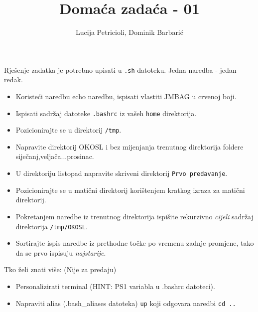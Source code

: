 \documentclass[12pt,a4paper]{article}
\newcommand{\shell}[1]{\texttt{#1}}
\begin{document}
  \title{Domaća zadaća - 01}
  \author{Lucija Petricioli, Dominik Barbarić}
  \maketitle
  Rješenje zadatka je potrebno upisati u \shell{.sh} datoteku. Jedna naredba - jedan redak.
  \begin{itemize}
    \item Koristeći naredbu echo naredbu, ispisati vlastiti JMBAG u crvenoj boji.
    \item Ispisati sadržaj datoteke \shell{.bashrc} iz vašeh \shell{home} direktorija.
    \item Pozicionirajte se u direktorij \shell{/tmp}.
    \item Napravite direktorij OKOSL i bez mijenjanja trenutnog direktorija foldere siječanj,veljača...prosinac.
    \item U direktoriju listopad napravite skriveni direktorij \shell{Prvo predavanje}.
    \item Pozicionirajte se u matični direktorij korištenjem kratkog izraza za matični direktorij.
    \item Pokretanjem naredbe iz trenutnog direktorija ispišite rekurzivno \textit{cijeli} sadržaj direktorija \shell{/tmp/OKOSL}.
    \item Sortirajte ispis naredbe iz prethodne točke po vremenu zadnje promjene, tako da se prvo ispisuju \textit{najstarije}.
  \end{itemize}
  Tko želi znati više: (Nije za predaju)
  \begin{itemize}
    \item Personalizirati terminal (HINT: PS1 variabla u .bashrc datoteci).
    \item Napraviti alias (.bash\_aliases datoteka) \shell{up} koji odgovara naredbi \shell{cd ..}
  \end{itemize}
\end{document}

